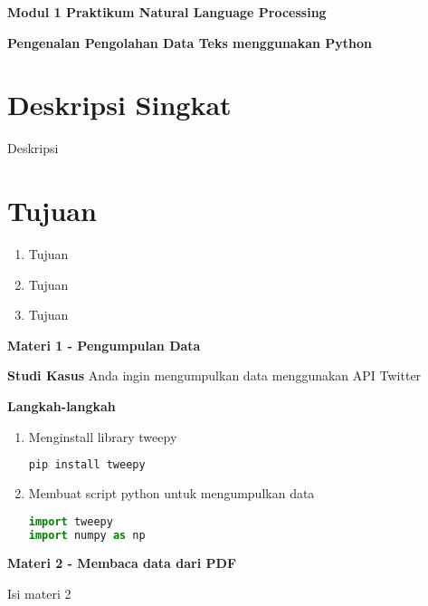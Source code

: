 \documentclass{article}
\begin{document}
    \begin{center}
        \textbf{Modul 1 Praktikum Natural Language Processing}

        \textbf{Pengenalan Pengolahan Data Teks menggunakan Python}
    \end{center}

    \section*{Deskripsi Singkat}
    Deskripsi

    \section*{Tujuan}
    \begin{enumerate}
        \item Tujuan
        \item Tujuan
        \item Tujuan
    \end{enumerate}

    \begin{flushleft}
        \textbf{Materi 1 - Pengumpulan Data}
        \newline
        
        \textbf{Studi Kasus}
        \newline
        Anda ingin mengumpulkan data menggunakan API Twitter
        \newline

        \textbf{Langkah-langkah}

        \begin{enumerate}
            \item Menginstall library tweepy
            \lstset{style=bashstyle}
            \begin{lstlisting}[language=bash]
pip install tweepy
            \end{lstlisting}

            \item Membuat script python untuk mengumpulkan data
            \lstset{style=pythonstyle}
            \begin{lstlisting}[language=python]
import tweepy
import numpy as np

            \end{lstlisting}
        \end{enumerate}
    \end{flushleft}

    \begin{flushleft}
        \textbf{Materi 2 - Membaca data dari PDF}
        \newline

        Isi materi 2
    \end{flushleft}
\end{document}
